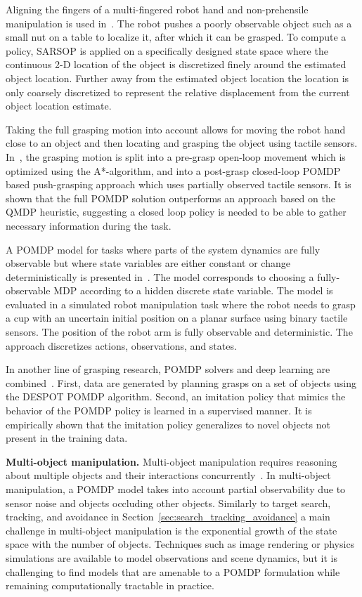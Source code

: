 \documentclass[journal]{IEEEtran}
\begin{document}
Aligning the fingers of a
multi-fingered robot hand and non-prehensile manipulation is {used} in~\cite{horowitz2013interactive}.
The robot pushes a poorly observable object such as a small nut on a
table to localize it, after which it can be grasped.
To compute a policy, SARSOP is applied on a specifically designed state space where the
continuous 2-D location of the object is
discretized finely around the estimated object location. Further away from the estimated object location
the location is only coarsely discretized to represent the relative displacement from the current object location estimate.

Taking the full grasping motion into account allows for moving the
robot hand close to an object and then locating and grasping the
object using tactile sensors.
In~\cite{koval2016pre}, the grasping motion is split
into a pre-grasp open-loop movement which is
optimized using the A*-algorithm, and into a post-grasp closed-loop
POMDP based push-grasping approach which {uses} partially observed
tactile sensors. It is shown that the full POMDP solution
outperforms an approach based on the QMDP heuristic, suggesting a closed loop policy is needed to be able to gather necessary
information during the task.

A POMDP model for tasks where parts of {the} system dynamics are fully observable but where state
variables are either constant or change deterministically is presented in~\cite{chen2016pomdp}.
The model corresponds to choosing a fully-observable MDP according to a hidden discrete
state variable. The model is evaluated in a simulated robot manipulation task where the robot needs to grasp a cup
with an uncertain initial position on a planar surface using binary
tactile sensors. The position of the robot arm is fully observable and
deterministic. The approach discretizes actions, observations, and
states.

In another line of grasping research,
POMDP solvers and deep learning are combined~\cite{garg2019learning}. First, data are generated by planning grasps on a set of objects using the DESPOT
POMDP algorithm. Second, an imitation policy that mimics the behavior of the POMDP
policy is learned in a supervised manner.
It is empirically shown that the imitation policy generalizes to novel objects not present in the training data.

\textbf{Multi-object manipulation.} Multi-object manipulation {requires reasoning about multiple objects and their interactions concurrently}~\cite{monso2012pomdp,pajarinen2017robotic,pajarinen2014robotic,li2016act,xiao2019online,pajarinen2020pomdp}. In
multi-object manipulation, a POMDP model takes into account partial
observability due to sensor noise and objects occluding other
objects. Similarly to target search, tracking, and avoidance in
Section~\ref{sec:search_tracking_avoidance} a main challenge in multi-object
manipulation is the exponential growth of the state space with the
number of objects. {Techniques such as image rendering or physics simulations are available to model observations and scene dynamics, but it is challenging to find models that are amenable to a POMDP formulation while remaining computationally tractable in practice.}
\end{document}
